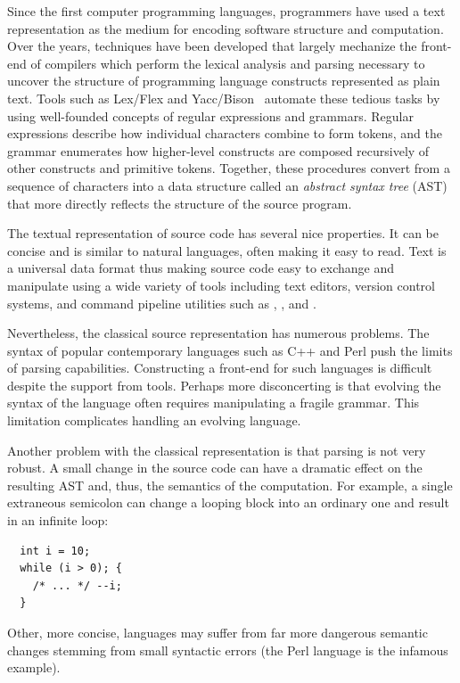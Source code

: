 \documentclass{article}
\begin{document}
Since the first computer programming languages, programmers have used a
text representation as the medium for encoding software structure and
computation.  Over the years, techniques have been developed that
largely mechanize the front-end of compilers which perform the lexical
analysis and parsing necessary to uncover the structure of programming
language constructs represented as plain text.  Tools such as Lex/Flex
and Yacc/Bison~\cite{Levine92} automate these tedious tasks by using
well-founded concepts of regular expressions and grammars. Regular
expressions describe how individual characters combine to form tokens,
and the grammar enumerates how higher-level constructs are composed
recursively of other constructs and primitive tokens.  Together, these
procedures convert from a sequence of characters into a data structure
called an \emph{abstract syntax tree} (AST) that more directly reflects
the structure of the source program.

The textual representation of source code has several nice properties.
It can be concise and is similar to natural languages, often making it
easy to read.  Text is a universal data format thus making source code
easy to exchange and manipulate using a wide variety of tools including
text editors, version control systems, and command pipeline utilities
such as , , and .

Nevertheless, the classical source representation has numerous problems.
The syntax of popular contemporary languages such as C++ and Perl push
the limits of parsing capabilities.  Constructing a front-end for such
languages is difficult despite the support from tools.  Perhaps more
disconcerting is that evolving the syntax of the language often requires
manipulating a fragile grammar.  This limitation complicates handling an
evolving language.

Another problem with the classical representation is that parsing is not
very robust.  A small change in the source code can have a dramatic
effect on the resulting AST and, thus, the semantics of the computation.
For example, a single extraneous semicolon can change a looping block
into an ordinary one and result in an infinite loop:

{\small
\begin{verbatim}
  int i = 10;
  while (i > 0); {
    /* ... */ --i;
  }
\end{verbatim}
}

Other, more concise, languages may suffer from far more dangerous
semantic changes stemming from small syntactic errors (the Perl language
is the infamous example).
\end{document}
